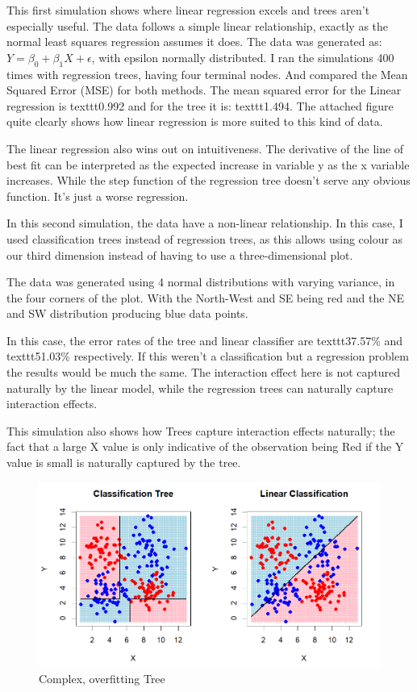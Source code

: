 \documentclass[12pt]{article}
\begin{document}
This first simulation shows where linear regression excels and trees aren't especially useful. The data follows a simple linear relationship, exactly as the normal least squares regression assumes it does. The data was generated as: $Y = \beta_0 + \beta_1X + \epsilon$, with epsilon normally distributed. I ran the simulations 400 times with regression trees, having four terminal nodes. And compared the Mean Squared Error (MSE) for both methods. The mean squared error for the Linear regression is texttt{0.992} and for the tree it is: texttt{1.494}. The attached figure quite clearly shows how linear regression is more suited to this kind of data.

The linear regression also wins out on intuitiveness. The derivative of the line of best fit can be interpreted as the expected increase in variable y as the x variable increases. While the step function of the regression tree doesn't serve any obvious function. It's just a worse regression.

In this second simulation, the data have a non-linear relationship. In this case, I used classification trees instead of regression trees, as this allows using colour as our third dimension instead of having to use a three-dimensional plot.

The data was generated using 4 normal distributions with varying variance, in the four corners of the plot. With the North-West and SE being red and the NE and SW distribution producing blue data points.

In this case, the error rates of the tree and linear classifier are texttt{37.57\%} and texttt{51.03\%} respectively. If this weren't a classification but a regression problem the results would be much the same. The interaction effect here is not captured naturally by the linear model, while the regression trees can naturally capture interaction effects.

This simulation also shows how Trees capture interaction effects naturally; the fact that a large X value is only indicative of the observation being Red if the Y value is small is naturally captured by the tree.

\begin{figure}
    \centering
    \includegraphics[scale=0.30]{NLD Pred.png}
    \caption{Complex, overfitting Tree}
\end{figure}
\end{document}
